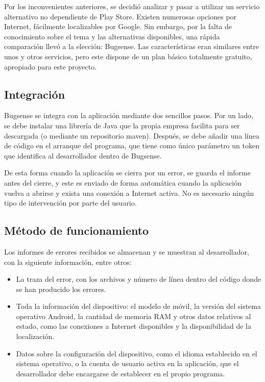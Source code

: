 \documentclass[main]{subfiles}
\begin{document}
Por los inconvenientes anteriores, se decidió analizar y pasar a utilizar un servicio alternativo no dependiente de Play Store. Existen numerosas opciones por Internet, fácilmente localizables por Google. Sin embargo, por la falta de conocimiento sobre el tema y las alternativas disponibles, una rápida comparación llevó a la elección: Bugsense. Las características eran similares entre unos y otros servicios, pero este dispone de un plan básico totalmente gratuito, apropiado para este proyecto.

\subsection{Integración}

Bugsense se integra con la aplicación mediante dos sencillos pasos. Por un lado, se debe instalar una librería de Java que la propia empresa facilita para ser descargada (o mediante un repositorio \gls{maven}). Después, se debe añadir una línea de código en el arranque del programa, que tiene como único parámetro un \gls{token} que identifica al desarrollador dentro de Bugsense.

De esta forma cuando la aplicación se cierra por un error, se guarda el informe antes del cierre, y este es enviado de forma automática cuando la aplicación vuelva a abrirse y exista una conexión a Internet activa. No es necesario ningún tipo de intervención por parte del usuario.

\subsection{Método de funcionamiento}
Los informes de errores recibidos se almacenan y se muestran al desarrollador, con la siguiente información, entre otros:

\begin{itemize}
    \item La traza del error, con los archivos y número de línea dentro del código donde se han producido los errores.
    \item Toda la información del dispositivo: el modelo de móvil, la versión del sistema operativo Android, la cantidad de memoria RAM y otros datos relativos al estado, como las conexiones a Internet disponibles y la disponibilidad de la localización.
    \item Datos sobre la configuración del dispositivo, como el idioma establecido en el sistema operativo, o la cuenta de usuario activa en la aplicación, que el desarrollador debe encargarse de establecer en el propio programa.
\end{itemize}
\end{document}
